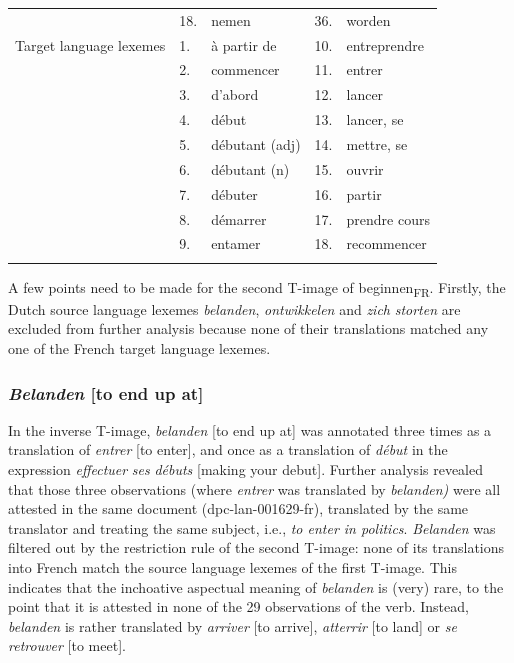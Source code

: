 \begin{table}
\begin{tabularx}{\textwidth}{p{}lXlX}
\rowcolor{lsLightGray}& 18.& nemen & 36.& worden \\
Target language lexemes & 1.& à partir de & 10.& entreprendre\\
& 2.& commencer & 11.& entrer\\
& 3.& d'abord & 12.& lancer\\
& 4.& début & 13.& lancer, se\\
& 5.& débutant (adj) & 14.& mettre, se\\
& 6.& débutant (n) & 15.& ouvrir\\
& 7.& débuter & 16.& partir\\
& 8.& démarrer & 17.& prendre cours\\
& 9.& entamer & 18.& recommencer\\
\lspbottomrule
\end{tabularx}
\end{table}


A few points need to be made for the second T-image of beginnen\textsubscript{FR}. Firstly, the Dutch source language lexemes \textit{belanden}, \textit{ontwikkelen} and \textit{zich} \textit{storten} are excluded from further analysis because none of their translations matched any one of the French target language lexemes.

\subsubsection{\textit{Belanden} [to end up at]}

In the inverse T-image, \textit{belanden} [to end up at] was annotated three times as a translation of \textit{entrer} [to enter], and once as a translation of \textit{début} in the expression \textit{effectuer} \textit{ses} \textit{débuts} [making your debut]. Further analysis revealed that those three observations (where \textit{entrer} was translated by \textit{belanden)} were all attested in the same document (dpc-lan-001629-fr), translated by the same translator and treating the same subject, i.e., \textit{to enter in politics}. \textit{Belanden} was filtered out by the restriction rule of the second T-image: none of its translations into French match the source language lexemes of the first T-image. This indicates that the inchoative aspectual meaning of \textit{belanden} is (very) rare, to the point that it is attested in none of the 29 observations of the verb. Instead, \textit{belanden} is rather translated by \textit{arriver} [to arrive], \textit{atterrir} [to land] or \textit{se} \textit{retrouver} [to meet].

